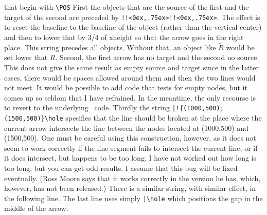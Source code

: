 \documentclass[12pt]{article}
\begin{document}
{that begin with \verb.\POS.  First the objects that are the
source of the first and the target of the second are preceded by
\verb;!!<0ex,.75ex>;\verb;!!<0ex,.75ex>;.  The effect is to reset the
baseline to the baseline of the object (rather than the vertical center)
and then to lower that by 3/4 of xheight so that the arrow goes in the
right place.  This string precedes all objects.  Without that, an object
like $\tilde R $ would be set lower that $R$.  Second, the first arrow
has no target and the second no source.  This does not give the same
result as empty source and target since in the latter cases, there would
be spaces allowed around them and then the two lines would not meet.  It
would be possible to add code that tests for empty nodes, but it comes
up so seldom that I have refrained.  In the meantime, the only recourse
is to revert to the underlying \xypic\ code.  Thirdly the string
\verb.|!{(1000,500);(1500,500)}\hole. specifies that the line should be
broken at the place where the current arrow intersects the line between
the nodes located at (1000,500) and (1500,500).  One must be careful
using this construction, however, as it does not seem to work correctly
if the line segment fails to intersect the current line, or if it does
intersect, but happens to be too long.  I have not worked out how long
is too long, but you can get odd results.  I assume that this bug will
be fixed eventually.  (Ross Moore says that it works correctly in the
version he has, which, however, has not been released.)  There is a
similar string, with similar effect, in the following line.  The last
line uses simply \index{|\hole}\verb.|\hole. which positions the gap in
the middle of the arrow.

}
\end{document}
